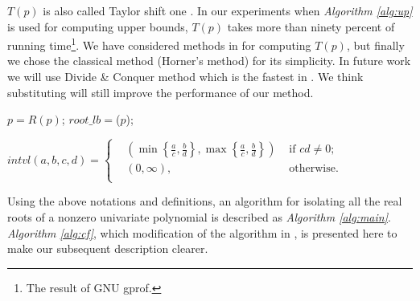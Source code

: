 $T(p)$  is also called	Taylor shift one \cite{ger04,joh05}. In our experiments when {\em Algorithm \ref{alg:up}} is used for computing upper bounds, $T(p)$  takes  more than
ninety percent of running time\footnote{The result of  GNU gprof.}.  We have considered methods in \cite{ger04} for computing $T(p)$, but   finally we chose the  classical
method (Horner's method) for its simplicity. In future work we will use Divide \& Conquer method which is the fastest in \cite{ger04}. We think  substituting
will still improve the performance of our method.




\begin{algorithm}
\caption{\lb \label{alg:lb}}
\DontPrintSemicolon
{}
$p=R(p)$;\;
$root\_lb=$\up($p$); 
\end{algorithm}


\begin{definition}
$  intvl(a,b,c,d)=  \left\{\begin{aligned}
&  (\min\left\{ \frac{a}{c},\frac{b}{d} \right\},\max\left\{ \frac{a}{c},\frac{b}{d} \right\} ) &\text{ if } cd\neq0;\\
& (0,\infty), &\text{ otherwise}.\\
	\end{aligned}
	\right.
$
\end{definition}


Using the above notations and definitions, an algorithm for isolating all the real roots of a nonzero univariate polynomial is described as {\em Algorithm \ref{alg:main}}.
{\em Algorithm \ref{alg:cf}}, which    modification of the algorithm in \cite{akr08}, is presented here to make our subsequent description clearer.





